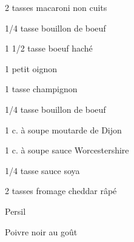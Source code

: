 %
%   
%   
%   
%




\totaltime{}


\begin{ingredients}
    \item[] 
    \item 2 tasses macaroni non cuits
    \item 1/4 tasse bouillon de boeuf
    \item 1 1/2 tasse boeuf haché
    \item 1 petit oignon
    \item 1 tasse champignon
    \item[] 
    \item 1/4 tasse bouillon de boeuf
    \item 1 c. à soupe moutarde de Dijon
    \item 1 c. à soupe sauce Worcestershire
    \item 1/4 tasse sauce soya
    \item 2 tasses fromage cheddar râpé
    \item Persil
    \item Poivre noir au goût
\end{ingredients}


